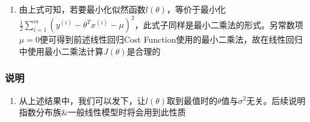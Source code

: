 \begin{enumerate}
	\item 由上式可知，若要最小化似然函数$l(\theta)$，等价于最小化$\frac{1}{2} \sum_{i=1}^{m}\left(y^{(i)}-\theta^Tx^{(i)}-\mu\right)^2$，此式子同样是最小二乘法的形式。另常数项$\mu = 0$便可得到前述线性回归Cost Function使用的最小二乘法，故在线性回归中使用最小二乘法计算$J(\theta)$是合理的

\end{enumerate}

\subsubsection{说明}
\begin{enumerate}
	\item 从上述结果中，我们可以发下，让$l(\theta)$取到最值时的$\theta$值与$\sigma^2$无关。后续说明指数分布族\&一般线性模型时将会用到此性质
\end{enumerate}













